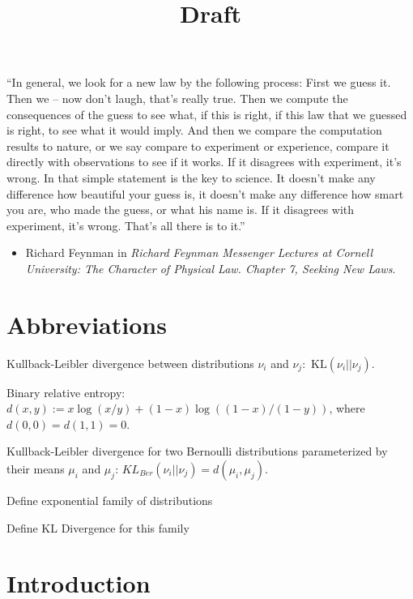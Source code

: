 \documentclass[11pt,]{article}
\title{Draft}
\author{}
\date{}
\providecommand{\tightlist}{%
  \setlength{\itemsep}{0pt}\setlength{\parskip}{0pt}}
\newcommand{\KL}{\,\text{KL}}
\begin{document}
\maketitle

{
\hypersetup{linkcolor=black}
\setcounter{tocdepth}{2}
\tableofcontents
}
\newpage

``In general, we look for a new law by the following process: First we
guess it. Then we -- now don't laugh, that's really true. Then we
compute the consequences of the guess to see what, if this is right, if
this law that we guessed is right, to see what it would imply. And then
we compare the computation results to nature, or we say compare to
experiment or experience, compare it directly with observations to see
if it works. If it disagrees with experiment, it's wrong. In that simple
statement is the key to science. It doesn't make any difference how
beautiful your guess is, it doesn't make any difference how smart you
are, who made the guess, or what his name is. If it disagrees with
experiment, it's wrong. That's all there is to it.''

\begin{itemize}
\tightlist
\item
  Richard Feynman in \emph{Richard Feynman Messenger Lectures at Cornell
  University: The Character of Physical Law. Chapter 7, Seeking New
  Laws}.
\end{itemize}

\newpage

\section{Abbreviations}\label{abbreviations}

Kullback-Leibler divergence between distributions \(\nu_i\) and
\(\nu_j\): \(\KL(\nu_i||\nu_j)\).

Binary relative entropy:
\(d(x,y) := x \log(x/y) + (1-x) \log((1-x)/(1-y))\), where
\(d(0,0) = d(1,1) = 0\).

Kullback-Leibler divergence for two Bernoulli distributions
parameterized by their means \(\mu_i\) and \(\mu_j\):
\(KL_{Ber}(\nu_i||\nu_j) = d(\mu_i, \mu_j)\).

Define exponential family of distributions

Define KL Divergence for this family

\newpage

\section{\texorpdfstring{Introduction
\label{chap:Introduction}}{Introduction }}\label{introduction}
\end{document}
